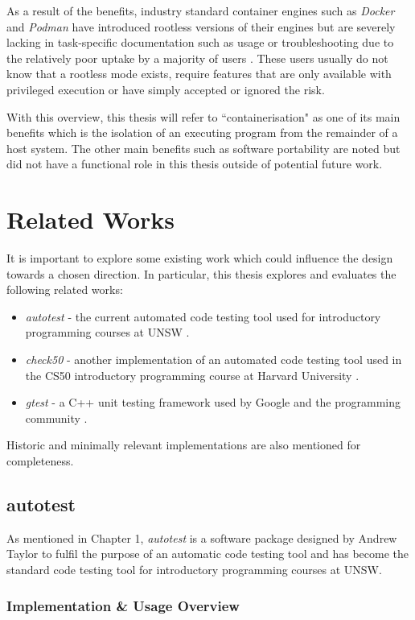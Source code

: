 \documentclass[hidelinks]{report}
\newcommand{\unchapter}[2]{
    \setcounter{chapter}{#1}
    \setcounter{section}{0}
    \chapter*{#2}
    \addcontentsline{toc}{chapter}{#2}
}
\begin{document}
As a result of the benefits, industry standard container engines such as \textit{Docker} and \textit{Podman} have introduced rootless versions of their engines but are severely lacking in task-specific documentation such as usage or troubleshooting due to the relatively poor uptake by a majority of users \cite{rootlessDocker}. These users usually do not know that a rootless mode exists, require features that are only available with privileged execution or have simply accepted or ignored the risk.

With this overview, this thesis will refer to ``containerisation" as one of its main benefits which is the isolation of an executing program from the remainder of a host system. The other main benefits such as software portability are noted but did not have a functional role in this thesis outside of potential future work.

\unchapter{3}{Related Works}

It is important to explore some existing work which could influence the design towards a chosen direction. In particular, this thesis explores and evaluates the following related works:
\begin{itemize}
	\item \textit{autotest} - the current automated code testing tool used for introductory programming courses at UNSW \cite{Autotest}.
	\item \textit{check50} - another implementation of an automated code testing tool used in the CS50 introductory programming course at Harvard University \cite{check50}.
	\item \textit{gtest} - a C++ unit testing framework used by Google and the programming community \cite{gtest}.
\end{itemize}
Historic and minimally relevant implementations are also mentioned for completeness.

\section{autotest}

As mentioned in Chapter 1, \textit{autotest} is a software package designed by Andrew Taylor to fulfil the purpose of an automatic code testing tool and has become the standard code testing tool for introductory programming courses at UNSW.

\subsection{Implementation \& Usage Overview}
\end{document}

